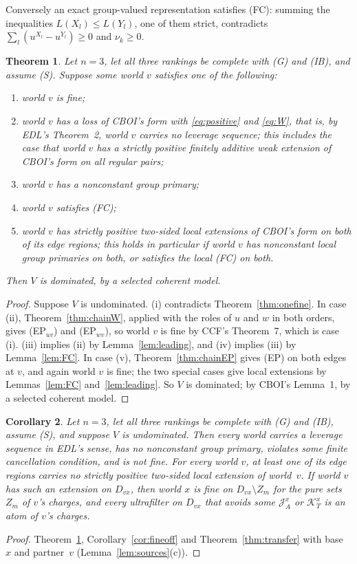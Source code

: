 \documentclass[11pt]{article}
\newtheorem{theorem}{Theorem}
\newtheorem{corollary}[theorem]{Corollary}
\theoremstyle{definition}\newtheorem{definition}[theorem]{Definition}
\theoremstyle{remark}\newtheorem{remark}[theorem]{Remark}
\newcommand{\Jid}{\mathcal J}
\newcommand{\Kid}{\mathcal K}
\begin{document}
Conversely an exact group-valued representation satisfies (FC): summing the
inequalities $L(X_l)\le L(Y_l)$, one of them strict, contradicts
$\sum_l(u^{X_l}-u^{Y_l})\ge0$ and $\nu_k\ge0$.

\begin{theorem}\label{thm:tame}
Let $n=3$, let all three rankings be complete with (G) and (IB), and assume
(S). Suppose some world $v$ satisfies one of the following:
\begin{enumerate}[label=(\roman*),leftmargin=*,itemsep=1pt]
\item world $v$ is fine;
\item world $v$ has a loss of CBOI's form with \eqref{eq:positive} and
\eqref{eq:W}, that is, by EDL's Theorem~2, world $v$ carries no leverage
sequence; this includes the case that world $v$ has a strictly
positive finitely additive weak extension of CBOI's form on all regular
pairs;
\item world $v$ has a nonconstant group primary;
\item world $v$ satisfies (FC);
\item world $v$ has strictly positive two-sided local extensions of CBOI's
form on both of its edge regions; this holds in particular if world
$v$ has nonconstant local group primaries on both, or satisfies the local
(FC) on both.
\end{enumerate}
Then $V$ is dominated, by a selected coherent model.
\end{theorem}
\begin{proof}
Suppose $V$ is undominated. (i) contradicts Theorem~\ref{thm:onefine}. In
case (ii), Theorem~\ref{thm:chainW}, applied with the roles of $u$ and $w$ in
both orders, gives (EP$_{uv}$) and (EP$_{wv}$), so world $v$ is fine by CCF's
Theorem~7, which is case (i). (iii) implies (ii) by Lemma~\ref{lem:leading},
and (iv) implies (iii) by Lemma~\ref{lem:FC}. In case (v),
Theorem~\ref{thm:chainEP} gives (EP) on both edges at $v$, and again world
$v$ is fine; the two special cases give local extensions by
Lemmas~\ref{lem:FC} and~\ref{lem:leading}. So $V$ is dominated; by CBOI's
Lemma~1, by a selected coherent model.
\end{proof}

\begin{corollary}\label{cor:tameshape}
Let $n=3$, let all three rankings be complete with (G) and (IB), assume (S),
and suppose $V$ is undominated. Then every world carries a leverage sequence
in EDL's sense, has no nonconstant group primary, violates some finite
cancellation condition, and is not fine. For every world $v$, at least one of
its edge regions carries no strictly positive two-sided local extension of
world~$v$. If world $v$ has such an extension on $D_{vx}$, then world $x$ is
fine on $D_{vx}\setminus Z_m$ for the pure sets $Z_m$ of $v$'s charges, and
every ultrafilter on $D_{vx}$ that avoids some $\Jid^x_A$ or $\Kid^x_T$ is an
atom of $v$'s charges.
\end{corollary}
\begin{proof}
Theorem~\ref{thm:tame}, Corollary~\ref{cor:fineoff} and
Theorem~\ref{thm:transfer} with base~$x$ and partner~$v$
(Lemma~\ref{lem:sources}(c)).
\end{proof}
\end{document}
